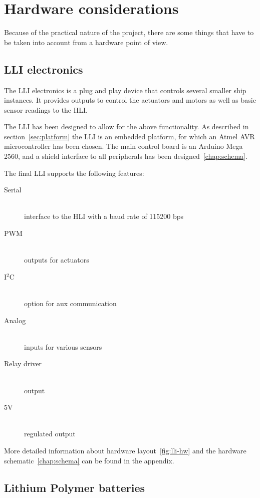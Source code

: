 \chapter{Hardware considerations}

Because of the practical nature of the project, there are some things that have to be taken into account from a hardware point of view.

\section{LLI electronics}
The \ac{LLI} electronics is a plug and play device that controls several smaller ship instances. It provides outputs to control the actuators and motors as well as basic sensor readings to the \ac{HLI}.

The \ac{LLI} has been designed to allow for the above functionality. As described in section~\vref{sec:platform} the \ac{LLI} is an embedded platform, for which an Atmel AVR microcontroller has been chosen. The main control board is an Arduino Mega 2560, and a shield interface to all peripherals has been designed~\vref{chap:schema}.

The final LLI supports the following features:
\begin{description}
\item[Serial]\hfill \\ interface to the \ac{HLI} with a baud rate of 115200 bps
\item[PWM]\hfill \\ outputs for actuators
\item[I$^2$C]\hfill \\ option for aux communication
\item[Analog]\hfill \\ inputs for various sensors
\item[Relay driver]\hfill \\ output
\item[5V]\hfill \\ regulated output
\end{description}

More detailed information about hardware layout~\vref{fig:lli-hw} and the hardware schematic~\vref{chap:schema} can be found in the appendix.

\section{Lithium Polymer batteries}

